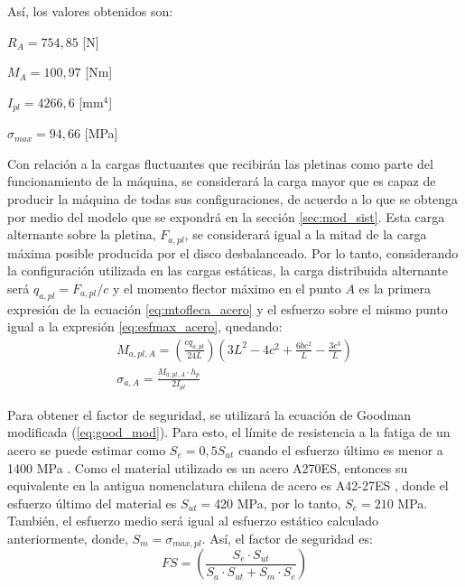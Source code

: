 Así, los valores obtenidos son:
\begin{itemize*}
	\item $R_A = 754,85$ [N]
	\item $M_A = 100,97$ [Nm]
	\item $I_{pl} = 4266,6$ [mm$^4$]
	\item $\sigma_{max} = 94,66$ [MPa]
\end{itemize*}

Con relación a la cargas fluctuantes que recibirán las pletinas como parte del funcionamiento de la máquina, se considerará la carga mayor que es capaz de producir la máquina de todas sus configuraciones, de acuerdo a lo que se obtenga por medio del modelo que se expondrá en la sección \ref{sec:mod_sist}. Esta carga alternante sobre la pletina, $F_{a,pl}$, se considerará igual a la mitad de la carga máxima posible producida por el disco desbalanceado. Por lo tanto, considerando la configuración utilizada en las cargas estáticas, la carga distribuida alternante será $q_{a,pl} = F_{a,pl}/c$ y el momento flector máximo en el punto $A$ es la primera expresión de la ecuación \ref{eq:mtofleca_acero} y el esfuerzo sobre el mismo punto igual a la expresión \ref{eq:esfmax_acero}, quedando:
\begin{gather}
	M_{a,pl,A} = \left(\frac{cq_{a,pl}}{24L}\right) \left(3L^2 - 4c^2 + \frac{6bc^2}{L} - \frac{3c^3}{L}\right)\\
	\sigma_{a,A} = \frac{M_{a,pl,A} \cdot h_p}{2I_{pl}}
\end{gather}

Para obtener el factor de seguridad, se utilizará la ecuación de Goodman modificada (\ref{eq:good_mod}). Para esto, el límite de resistencia a la fatiga de un acero se puede estimar como $S_e = 0,5S_{ut}$ cuando el esfuerzo último es menor a 1400 MPa \cite{budynas2008shigley}. Como el material utilizado es un acero A270ES, entonces su equivalente en la antigua nomenclatura chilena de acero es A42-27ES \cite{nch203}, donde el esfuerzo último del material es $S_{ut} =$420 MPa, por lo tanto, $S_e = 210$ MPa. También, el esfuerzo medio será igual al esfuerzo estático calculado anteriormente, donde, $S_m = \sigma_{max,pl}$. Así, el factor de seguridad es:
\begin{equation}
	FS = \left(\frac{S_e\cdot S_{ut}}{S_a\cdot S_{ut} + S_m\cdot S_e}\right)
\end{equation}


